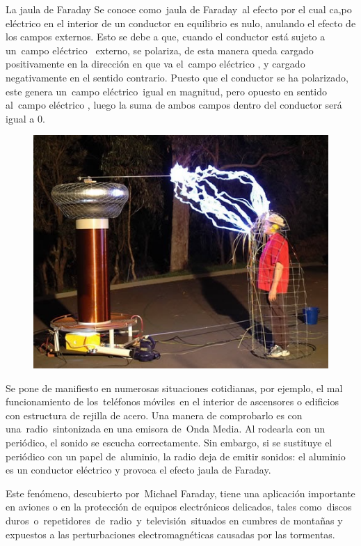 \newpage %

\begin{myblock}{La jaula de Faraday}
\vspace{2mm} Se conoce como jaula de Faraday al efecto por el cual ca,po eléctrico en el interior de un conductor en equilibrio es nulo, anulando el efecto de los campos externos. Esto se debe a que, cuando el conductor está sujeto a un campo eléctrico  externo, se polariza, de esta manera queda cargado positivamente en la dirección en que va el campo eléctrico , y cargado negativamente en el sentido contrario. Puesto que el conductor se ha polarizado, este genera un campo eléctrico igual en magnitud, pero opuesto en sentido al campo eléctrico , luego la suma de ambos campos dentro del conductor será igual a $0$.

\begin{figure}[H]
	\centering
	\includegraphics[width=.75\textwidth]{imagenes/imagenes24/T24IM16.png}
\end{figure}

\vspace{2mm} Se pone de manifiesto en numerosas situaciones cotidianas, por ejemplo, el mal funcionamiento de los teléfonos móviles en el interior de ascensores o edificios con estructura de rejilla de acero. Una manera de comprobarlo es con una radio sintonizada en una emisora de Onda Media. Al rodearla con un periódico, el sonido se escucha correctamente. Sin embargo, si se sustituye el periódico con un papel de aluminio, la radio deja de emitir sonidos: el aluminio es un conductor eléctrico y provoca el efecto jaula de Faraday.

\vspace{2mm} Este fenómeno, descubierto por Michael Faraday, tiene una aplicación importante en aviones o en la protección de equipos electrónicos delicados, tales como discos duros o repetidores de radio y televisión situados en cumbres de montañas y expuestos a las perturbaciones electromagnéticas causadas por las tormentas.
\end{myblock}



